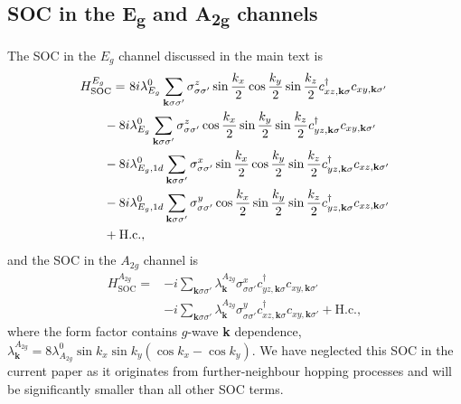 \documentclass[%
reprint,
superscriptaddress,
 amsmath,amssymb,
 aps,
prb,
nobalancelastpage,
]{revtex4-2}
\begin{document}
\renewcommand{\theequation}{A\arabic{equation}}
\setcounter{equation}{0}


\renewcommand{\thesubsection}{\arabic{subsection}}

\subsection{SOC in the \texorpdfstring{E\textsubscript{g}}{Eg} and \texorpdfstring{A\textsubscript{2g}}{A2g} channels}

The SOC in the $E_{g}$ channel discussed in the main text is
\begin{equation}    \label{egsoc}
\begin{aligned}
    H_{\text{SOC}}^{E_{g}} = &~8i\lambda_{E_{g}}^{0}\sum_{\textbf{k}\sigma\sigma'}\sigma_{\sigma\sigma'}^{z}\sin{\frac{k_x}{2}}\cos{\frac{k_y}{2}}\sin{\frac{k_z}{2}}c_{xz,\textbf{k}\sigma}^{\dagger}c_{xy,\textbf{k}\sigma'}\\
    &\hspace{-6mm}-8i\lambda_{E_{g}}^{0}\sum_{\textbf{k}\sigma\sigma'}\sigma_{\sigma\sigma'}^{z}\cos{\frac{k_x}{2}}\sin{\frac{k_y}{2}}\sin{\frac{k_z}{2}}c_{yz,\textbf{k}\sigma}^{\dagger}c_{xy,\textbf{k}\sigma'}\\
    &\hspace{-6mm}-8i\lambda_{E_{g},1d}^{0}\sum_{\textbf{k}\sigma\sigma'}\sigma^{x}_{\sigma\sigma'}\sin{\frac{k_x}{2}}\cos{\frac{k_y}{2}}\sin{\frac{k_z}{2}}c_{yz,\textbf{k}\sigma}^{\dagger}c_{xz,\textbf{k}\sigma'}
    \\&\hspace{-6mm}-8i\lambda_{E_{g},1d}^{0}\sum_{\textbf{k}\sigma\sigma'}\sigma^{y}_{\sigma\sigma'}\cos{\frac{k_x}{2}}\sin{\frac{k_y}{2}}\sin{\frac{k_z}{2}}c_{yz,\textbf{k}\sigma}^{\dagger}c_{xz,\textbf{k}\sigma'}  \\&\hspace{-6mm}+\text{H.c.},
\end{aligned}
\end{equation}
and the SOC in the $A_{2g}$ channel is
\begin{equation}
    \begin{aligned}
    H_{\text{SOC}}^{A_{2g}} = &-i\sum_{\textbf{k}\sigma\sigma'}\lambda_{\textbf{k}}^{A_{2g}}\sigma_{\sigma\sigma'}^{x}c_{yz,\textbf{k}\sigma}^{\dagger}c_{xy,\textbf{k}\sigma'}\\[6pt]&-i\sum_{\textbf{k}\sigma\sigma'}\lambda_{\textbf{k}}^{A_{2g}}\sigma_{\sigma\sigma'}^{y}c_{xz,\textbf{k}\sigma}^{\dagger}c_{xy,\textbf{k}\sigma'} + \text{H.c.},
    \end{aligned}
\end{equation}
where the form factor contains $g$-wave \textbf{k} dependence, $\lambda_{\textbf{k}}^{A_{2g}} = 8\lambda_{A_{2g}}^{0}\sin{k_x}\sin{k_y}(\cos{k_x}-\cos{k_y})$. We have neglected this SOC in the current paper as it originates from further-neighbour hopping processes and will be significantly smaller than all other SOC terms.
\end{document}
